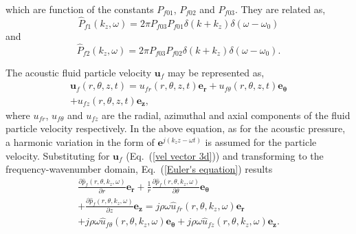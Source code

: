 \documentclass[10pt]{asme2ej}
\begin{document}
which are function of the constants $P_{f01}$, $P_{f02}$ and $P_{f03}$. They are related as,
\begin{equation}
    \hat{P}_{f1}(k_z,\omega) = 2\pi P_{f03}P_{f01}\delta(k+k_z)\delta(\omega-\omega_0)
\end{equation}
and
\begin{equation}
    \hat{P}_{f2}(k_z,\omega) = 2\pi P_{f03}P_{f02}\delta(k+k_z)\delta(\omega-\omega_0).
\end{equation}





 The acoustic fluid particle velocity $\mathbf{u}_f$ may be represented as,
\begin{multline}\label{vel vector 3d}
    \mathbf{u}_f(r,\theta,z,t) = u_{fr}(r,\theta,z,t)\mathbf{e_r} + u_{f\theta}(r,\theta,z,t)\mathbf{e}_{\pmb{\theta}}\\ + u_{fz}(r,\theta,z,t)\mathbf{e_z},
\end{multline}
where $u_{fr}$, $u_{f\theta}$ and $u_{fz}$ are the radial, azimuthal and axial components of the fluid particle velocity respectively. In the above equation, as for the acoustic pressure, a harmonic variation in the form of $\mathbf{e}^{j(k_{z}z-\omega t)}$ is assumed for the particle velocity. Substituting for $\mathbf{u}_f$ (Eq.~(\ref{vel vector 3d})) and transforming to the frequency-wavenumber domain, Eq.~(\ref{Euler's equation}) results
\begin{multline}\label{equating continuity equation}
    \frac{\partial \hat{p}_f(r,\theta,k_z,\omega)}{\partial r}\mathbf{e_r} + \frac{1}{r}\frac{\partial \hat{p}_f(r,\theta,k_z,\omega)}{\partial \theta}\mathbf{e}_{\pmb{\theta}}\\ + \frac{\partial \hat{p}_f(r,\theta,k_z,\omega)}{\partial z}\mathbf{e_z} = j\rho\omega \hat{u}_{fr}(r,\theta,k_z,\omega)\mathbf{e_r}\\ + j\rho\omega \hat{u}_{f\theta}(r,\theta,k_z,\omega) \mathbf{e}_{\pmb{\theta}} + j\rho\omega \hat{u}_{fz}(r,\theta,k_z,\omega)\mathbf{e_z}.
\end{multline}






\end{document}
